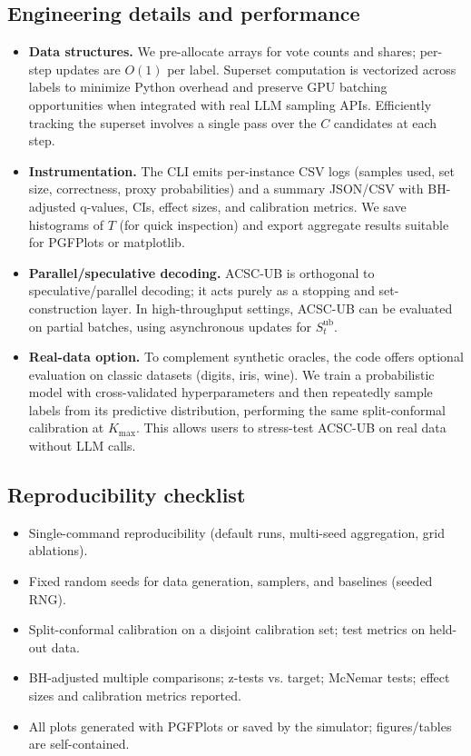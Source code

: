 \documentclass[11pt]{article}
\begin{document}
\subsection{Engineering details and performance}
\begin{itemize}
\item \textbf{Data structures.} We pre-allocate arrays for vote counts and shares; per-step updates are $O(1)$ per label. Superset computation is vectorized across labels to minimize Python overhead and preserve GPU batching opportunities when integrated with real LLM sampling APIs. Efficiently tracking the superset involves a single pass over the $C$ candidates at each step.
\item \textbf{Instrumentation.} The CLI emits per-instance CSV logs (samples used, set size, correctness, proxy probabilities) and a summary JSON/CSV with BH-adjusted q-values, CIs, effect sizes, and calibration metrics. We save histograms of $T$ (for quick inspection) and export aggregate results suitable for PGFPlots or matplotlib.
\item \textbf{Parallel/speculative decoding.} ACSC-UB is orthogonal to speculative/parallel decoding; it acts purely as a stopping and set-construction layer. In high-throughput settings, ACSC-UB can be evaluated on partial batches, using asynchronous updates for $S_t^{\text{ub}}$.
\item \textbf{Real-data option.} To complement synthetic oracles, the code offers optional evaluation on classic datasets (digits, iris, wine). We train a probabilistic model with cross-validated hyperparameters and then repeatedly sample labels from its predictive distribution, performing the same split-conformal calibration at $K_{\max}$. This allows users to stress-test ACSC-UB on real data without LLM calls.
\end{itemize}

\subsection{Reproducibility checklist}
\begin{itemize}
\item Single-command reproducibility (default runs, multi-seed aggregation, grid ablations).
\item Fixed random seeds for data generation, samplers, and baselines (seeded RNG).
\item Split-conformal calibration on a disjoint calibration set; test metrics on held-out data.
\item BH-adjusted multiple comparisons; z-tests vs. target; McNemar tests; effect sizes and calibration metrics reported.
\item All plots generated with PGFPlots or saved by the simulator; figures/tables are self-contained.
\end{itemize}
\end{document}
